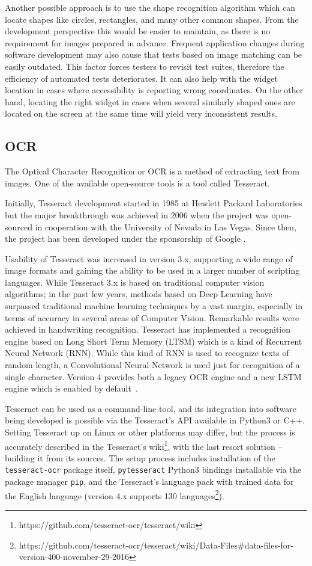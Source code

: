 Another possible approach is to use the shape recognition algorithm which can locate shapes like circles, rectangles, and many other common shapes. From the development perspective this would be easier to maintain, as there is no requirement for images prepared in advance. Frequent application changes during software development may also cause that tests based on image matching can be easily outdated. This factor forces testers to revisit test suites, therefore the efficiency of automated tests deteriorates. It can also help with the widget location in cases where accessibility is reporting wrong coordinates. On the other hand, locating the right widget in cases when several similarly shaped ones are located on the screen at the same time will yield very inconsistent results.

\subsection{OCR}\label{OCR_section}
The Optical Character Recognition or OCR is a method of extracting text from images. One of the available open-source tools is a tool called Tesseract.

Initially, Tesseract development started in 1985 at Hewlett Packard Laboratories but the major breakthrough was achieved in 2006 when the project was open-sourced in cooperation with the University of Nevada in Las Vegas. Since then, the project has been developed under the sponsorship of Google \cite{tesseract_history}.

Usability of Tesseract was increased in version 3.x, supporting a wide range of image formats and gaining the ability to be used in a larger number of scripting languages. While Tesseract 3.x is based on traditional computer vision algorithms; in the past few years, methods based on Deep Learning have surpassed traditional machine learning techniques by a vast margin, especially in terms of accuracy in several areas of Computer Vision. Remarkable results were achieved in handwriting recognition. Tesseract has implemented a recognition engine based on Long Short Term Memory (LTSM) which is a kind of Recurrent Neural Network (RNN). While this kind of RNN is used to recognize texts of random length, a Convolutional Neural Network is used just for recognition of a single character. Version 4 provides both a legacy OCR engine and a new LSTM engine which is enabled by default~\cite{tesseract}. 

Tesseract can be used as a command-line tool, and its integration into software being developed is possible via the Tesseract's API available in Python3 or C++. Setting Tesseract up on Linux or other platforms may differ, but the process is accurately described in the Tesseract's wiki\footnote{https://github.com/tesseract-ocr/tesseract/wiki}, with the last resort solution -- building it from its sources.
The setup process includes installation of the \texttt{tesseract-ocr} package itself, \texttt{pytesseract} Python3 bindings installable via the package manager \texttt{pip}, and the Tesseract's language pack with trained data for the English language (version 4.x supports 130 languages\footnote{https://github.com/tesseract-ocr/tesseract/wiki/Data-Files\#data-files-for-version-400-november-29-2016}). 

